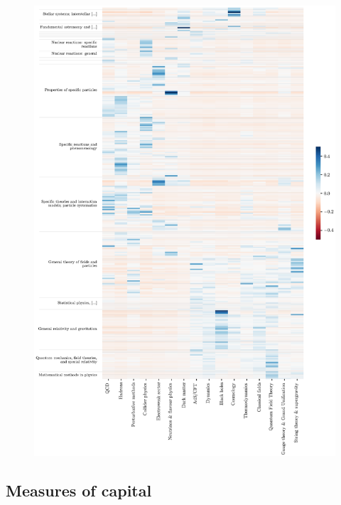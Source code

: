 \documentclass{article}
\begin{document}
\begin{figure}[H]
    \centering
    \includegraphics[height=0.75\paperheight
]{plots/pacs_clustermap.eps}
    \caption{}
\end{figure}


\subsection{\label{appendix:capital_validation}Measures of capital}
\end{document}

